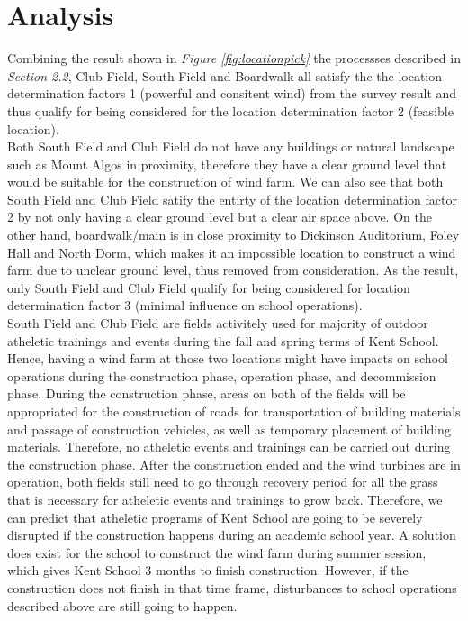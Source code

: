 \documentclass[review]{elsarticle}
\begin{document}

\clearpage

\section{Analysis}
\label{sec:analysis}

Combining the result shown in \textit{Figure \ref{fig:locationpick}} the processses described in \textit{Section 2.2}, Club Field, South Field and Boardwalk all satisfy the the location determination factors 1 (powerful and consitent wind) 
from the survey result and thus qualify for being considered for the location determination factor 2 (feasible location).  %
\\\indent Both South Field and Club Field do not have any buildings or natural landscape such as Mount Algos in proximity, therefore they have a clear ground level that would 
be suitable for the construction of wind farm. We can also see that both South Field and Club Field satify the entirty of the location determination factor 2 by not only having 
a clear ground level but a clear air space above. On the other hand, boardwalk/main is in close proximity to Dickinson Auditorium, Foley Hall and North Dorm, which makes it an 
impossible location to construct a wind farm due to unclear ground level, thus removed from consideration. As the result, only South Field and Club Field qualify for being 
considered for location determination factor 3 (minimal influence on school operations).
\\\indent South Field and Club Field are fields activitely used for majority of outdoor atheletic trainings and events during the fall and spring terms of Kent School. Hence, 
having a wind farm at those two locations might have impacts on school operations during the construction phase, operation phase, and decommission phase. During the construction 
phase, areas on both of the fields will be appropriated for the construction of roads for transportation of building materials and passage of construction vehicles, as well as
temporary placement of building materials. Therefore, no atheletic events and trainings can be carried out during the construction phase. After the construction ended and the wind 
turbines are in operation, both fields still need to go through recovery period for all the grass that is necessary for atheletic events and trainings to grow back. Therefore, we 
can predict that atheletic programs of Kent School are going to be severely disrupted if the construction happens during an academic school year. A solution does exist for the school 
to construct the wind farm during summer session, which gives Kent School 3 months to finish construction. However, if the construction does not finish in that time frame, disturbances 
to school operations described above are still going to happen. %
\end{document}
